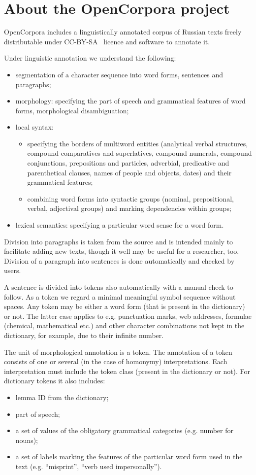 \documentclass[a4paper]{article}
\begin{document}
\section{About the OpenCorpora project}
OpenCorpora includes a linguistically annotated corpus of Russian texts freely distributable under CC-BY-SA~\cite{cc-by-sa} licence and software to annotate it.

Under linguistic annotation we understand the following:
\begin{itemize}
\item segmentation of a character sequence into word forms, sentences and paragraphs;
\item morphology: specifying the part of speech and grammatical features of word forms, morphological disambiguation;
\item local syntax:
\begin{itemize}
\item specifying the borders of multiword entities (analytical verbal structures, compound comparatives and superlatives, compound numerals, compound conjunctions, prepositions and particles, adverbial, predicative and parenthetical clauses, names of people and objects, dates) and their grammatical features;
\item combining word forms into syntactic groups (nominal, prepositional, verbal, adjectival groups) and marking dependencies within groups;
\end{itemize}
\item lexical semantics: specifying a particular word sense for a word form.
\end{itemize}

Division into paragraphs is taken from the source and is intended mainly to facilitate adding new texts, though it well may be useful for a researcher, too. Division of a paragraph into sentences is done automatically and checked by users.

A sentence is divided into tokens also automatically with a manual check to follow. As a token we regard a minimal meaningful symbol sequence without spaces. Any token may be either a word form (that is present in the dictionary) or not. The latter case applies to e.g. punctuation marks, web addresses, formulae (chemical, mathematical etc.) and other character combinations not kept in the dictionary, for example, due to their infinite number.

The unit of morphological annotation is a token. The annotation of a token consists of one or several (in the case of homonymy) interpretations. Each interpretation must include the token class (present in the dictionary or not). For dictionary tokens it also includes:
\begin{itemize}
\item lemma ID from the dictionary;
\item part of speech;
\item a set of values of the obligatory grammatical categories (e.g. number for nouns);
\item a set of labels marking the features of the particular word form used in the text (e.g. ``misprint'', ``verb used impersonally'').
\end{itemize}
\end{document}
